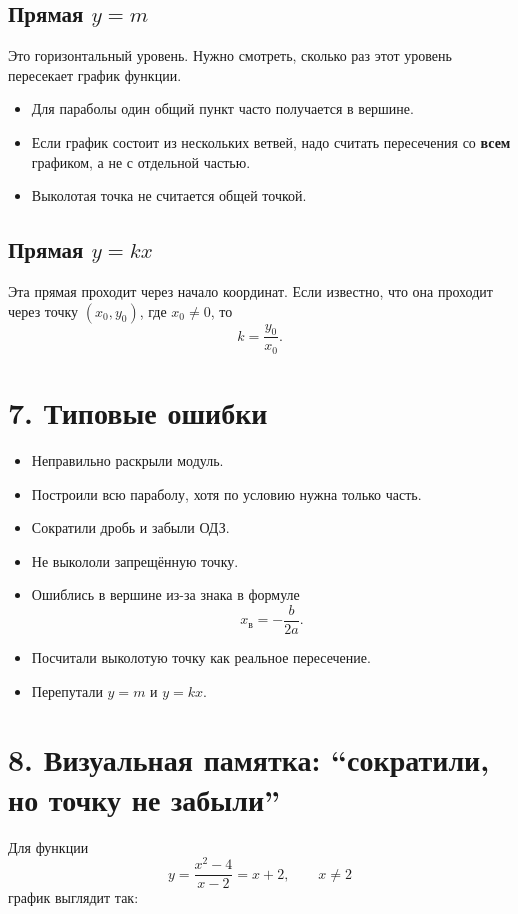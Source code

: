 \documentclass[a4paper,12pt]{article}
\begin{document}
\subsection*{Прямая \(y=m\)}
Это горизонтальный уровень. Нужно смотреть, сколько раз этот уровень пересекает график функции.

\begin{itemize}
	\item Для параболы один общий пункт часто получается в вершине.
	\item Если график состоит из нескольких ветвей, надо считать пересечения со \textbf{всем} графиком, а не с отдельной частью.
	\item Выколотая точка не считается общей точкой.
\end{itemize}

\subsection*{Прямая \(y=kx\)}
Эта прямая проходит через начало координат. Если известно, что она проходит через точку \((x_0,y_0)\), где \(x_0\ne 0\), то
\[
k=\frac{y_0}{x_0}.
\]

\section*{\textcolor{darkaccent}{7. Типовые ошибки}}
\begin{itemize}
	\item Неправильно раскрыли модуль.
	\item Построили всю параболу, хотя по условию нужна только часть.
	\item Сократили дробь и забыли ОДЗ.
	\item Не выкололи запрещённую точку.
	\item Ошиблись в вершине из-за знака в формуле
	\[
	x_{\text{в}}=-\frac{b}{2a}.
	\]
	\item Посчитали выколотую точку как реальное пересечение.
	\item Перепутали \(y=m\) и \(y=kx\).
\end{itemize}

\section*{\textcolor{darkaccent}{8. Визуальная памятка: ``сократили, но точку не забыли''}}
Для функции
\[
y=\frac{x^2-4}{x-2}=x+2,\qquad x\ne 2
\]
график выглядит так:
\end{document}
